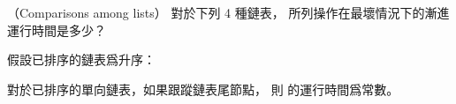 \startPROBLEM
（Comparisons among lists）
對於下列 4 種鏈表，
所列操作在最壞情況下的漸進運行時間是多少？
\stopPROBLEM

\startANSWER
假設已排序的鏈表爲升序：


對於已排序的單向鏈表，如果跟蹤鏈表尾節點，
則  的運行時間爲常數。
\stopANSWER
